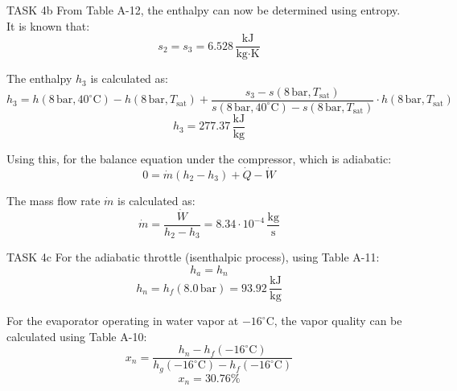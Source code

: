 TASK 4b  
From Table A-12, the enthalpy can now be determined using entropy. It is known that:  
\[
s_2 = s_3 = 6.528 \, \frac{\text{kJ}}{\text{kg·K}}
\]  

The enthalpy \( h_3 \) is calculated as:  
\[
h_3 = h(8 \, \text{bar}, 40^\circ\text{C}) - h(8 \, \text{bar}, T_{\text{sat}}) + \frac{s_3 - s(8 \, \text{bar}, T_{\text{sat}})}{s(8 \, \text{bar}, 40^\circ\text{C}) - s(8 \, \text{bar}, T_{\text{sat}})} \cdot h(8 \, \text{bar}, T_{\text{sat}})
\]  
\[
h_3 = 277.37 \, \frac{\text{kJ}}{\text{kg}}
\]  

Using this, for the balance equation under the compressor, which is adiabatic:  
\[
0 = \dot{m}(h_2 - h_3) + \dot{Q} - \dot{W}
\]  

The mass flow rate \( \dot{m} \) is calculated as:  
\[
\dot{m} = \frac{\dot{W}}{h_2 - h_3} = 8.34 \cdot 10^{-4} \, \frac{\text{kg}}{\text{s}}
\]  

TASK 4c  
For the adiabatic throttle (isenthalpic process), using Table A-11:  
\[
h_a = h_n
\]  
\[
h_n = h_f(8.0 \, \text{bar}) = 93.92 \, \frac{\text{kJ}}{\text{kg}}
\]  

For the evaporator operating in water vapor at \( -16^\circ\text{C} \), the vapor quality can be calculated using Table A-10:  
\[
x_n = \frac{h_n - h_f(-16^\circ\text{C})}{h_g(-16^\circ\text{C}) - h_f(-16^\circ\text{C})}
\]  
\[
x_n = 30.76\%
\]